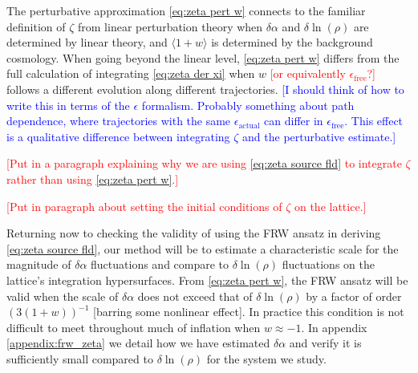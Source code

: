 The perturbative approximation \eqref{eq:zeta pert w} connects to the familiar definition of $\zeta$ from linear perturbation theory when $\delta\alpha$ and $\delta\ln(\rho)$ are determined by linear theory, and $\langle 1+w \rangle$ is determined by the background cosmology. When going beyond the linear level, \eqref{eq:zeta pert w} differs from the full calculation of integrating \eqref{eq:zeta der xi} when $w$ \textcolor{red}{[or equivalently $\epsilon_\mathrm{free}$?]} follows a different evolution along different trajectories.
\textcolor{blue}{[I should think of how to write this in terms of the $\epsilon$ formalism. Probably something about path dependence, where trajectories with the same $\epsilon_\mathrm{actual}$ can differ in $\epsilon_\mathrm{free}$. This effect is a qualitative difference between integrating $\zeta$ and the perturbative estimate.]} 

\textcolor{red}{[Put in a paragraph explaining why we are using \eqref{eq:zeta source fld} to integrate $\zeta$ rather than using \eqref{eq:zeta pert w}.]}

\textcolor{red}{[Put in paragraph about setting the initial conditions of $\zeta$ on the lattice.]}

Returning now to checking the validity of using the FRW ansatz in deriving \eqref{eq:zeta source fld}, our method will be to estimate a characteristic scale for the magnitude of $\delta\alpha$ fluctuations and compare to $\delta\ln(\rho)$ fluctuations on the lattice's integration hypersurfaces. From \eqref{eq:zeta pert w}, the FRW ansatz will be valid when the scale of $\delta\alpha$ does not exceed that of $\delta\ln(\rho)$ by a factor of order $(3(1+w))^{-1}$ \textrm{[barring some nonlinear effect]}. In practice this condition is not difficult to meet throughout much of inflation when $w \approx -1$. In appendix \ref{appendix:frw_zeta} we detail how we have estimated $\delta\alpha$ and verify it is sufficiently small compared to $\delta\ln(\rho)$ for the system we study.


